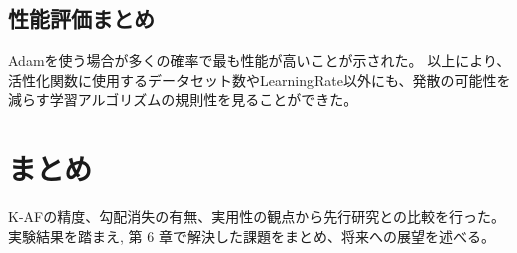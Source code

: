 \subsection{性能評価まとめ}
Adamを使う場合が多くの確率で最も性能が高いことが示された。
以上により、活性化関数に使用するデータセット数やLearningRate以外にも、発散の可能性を減らす学習アルゴリズムの規則性を見ることができた。



\section{まとめ}

K-AFの精度、勾配消失の有無、実用性の観点から先行研究との比較を行った。
実験結果を踏まえ, 第 6 章で解決した課題をまとめ、将来への展望を述べる。


